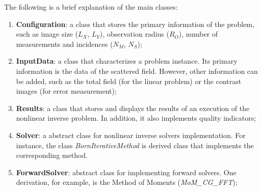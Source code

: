 			The following is a brief explanation of the main classes:
			\begin{enumerate}
				\item\textbf{Configuration}: a class that stores the primary information of the problem, such as image size ($L_X$, $L_Y$), observation radius ($R_O$), number of measurements and incidences ($N_M$, $N_S$);
				\item\textbf{InputData}: a class that characterizes a problem instance. Its primary information is the data of the scattered field. However, other information can be added, such as the total field (for the linear problem) or the contrast images (for error measurement);
				\item\textbf{Results}: a class that stores and displays the results of an execution of the nonlinear inverse problem. In addition, it also implements quality indicators;
				\item\textbf{Solver}: a abstract class for nonlinear inverse solvers implementation. For instance, the class \textit{BornIterativeMethod}  is derived class that implements the corresponding method.
				\item\textbf{ForwardSolver}: abstract class for implementing forward solvers. One derivation, for example, is the Method of Moments (\textit{MoM\_CG\_FFT});

\end{enumerate}
